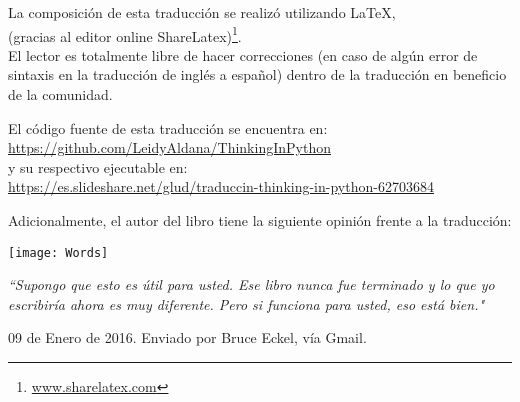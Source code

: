 \newpage
\thispagestyle{empty}


La composición de esta traducción se realizó utilizando \LaTeX, \\(gracias al editor online ShareLatex)\footnote{\url{www.sharelatex.com}}. \\

El lector es totalmente libre de hacer correcciones (en caso de algún error de sintaxis en la traducción de inglés a español) dentro de la traducción en beneficio de la comunidad. \\

\begin{center}

El código fuente de esta traducción se encuentra en: \\
\url{https://github.com/LeidyAldana/ThinkingInPython}  \\
y su respectivo ejecutable en: \\ \url{https://es.slideshare.net/glud/traduccin-thinking-in-python-62703684}


\end{center}

\vspace{0.6cm}

Adicionalmente, el autor del libro tiene la siguiente opinión frente a la traducción:

\vspace{0.6cm}

\texttt{[image: Words]}

\vspace{0.6cm}

\textit{ “Supongo que esto es útil para usted. Ese libro nunca fue terminado y lo que yo escribiría ahora es muy diferente. Pero si funciona para usted, eso está bien."  }   

\begin{flushright}

    09 de Enero de 2016. Enviado por Bruce Eckel, vía Gmail.
    
\end{flushright}


\newpage

